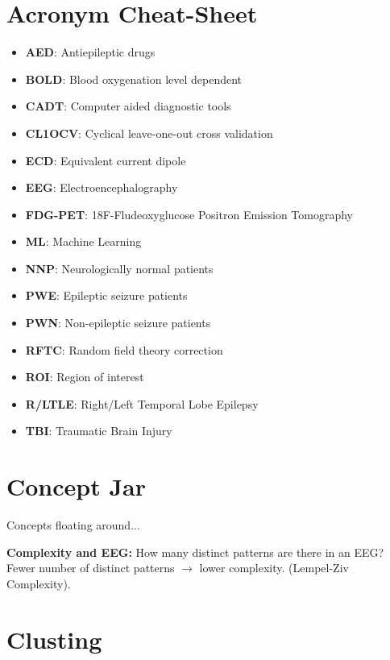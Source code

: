 \documentclass{article}
\begin{document}
    \section{Acronym Cheat-Sheet}
        \begin{itemize}
            \item \textbf{AED}: Antiepileptic drugs
            \item \textbf{BOLD}: Blood oxygenation level dependent
            \item \textbf{CADT}: Computer aided diagnostic tools
            \item \textbf{CL1OCV}: Cyclical leave-one-out cross validation
            \item \textbf{ECD}: Equivalent current dipole
            \item \textbf{EEG}: Electroencephalography
            \item \textbf{FDG-PET}: 18F-Fludeoxyglucose Positron Emission 
Tomography
            \item \textbf{ML}: Machine Learning
            \item \textbf{NNP}: Neurologically normal patients
            \item \textbf{PWE}: Epileptic seizure patients
            \item \textbf{PWN}: Non-epileptic seizure patients
            \item \textbf{RFTC}: Random field theory correction
            \item \textbf{ROI}: Region of interest
            \item \textbf{R/LTLE}: Right/Left Temporal Lobe Epilepsy
            \item \textbf{TBI}: Traumatic Brain Injury
        \end{itemize}

    \section{Concept Jar}
        Concepts floating around...

        \textbf{Complexity and EEG:} How many distinct patterns are there in an 
EEG?
        Fewer number of distinct patterns \ensuremath{\rightarrow} lower 
complexity.
        (Lempel-Ziv Complexity).

   


    \section{Clusting}
\end{document}
